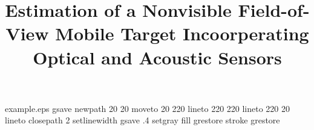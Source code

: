 %
%
%
%
%
\begin{filecontents*}{example.eps}
gsave
newpath
  20 20 moveto
  20 220 lineto
  220 220 lineto
  220 20 lineto
closepath
2 setlinewidth
gsave
  .4 setgray fill
grestore
stroke
grestore
\end{filecontents*}
%
\RequirePackage{fix-cm}
%
\documentclass[twocolumn]{svjour3}          %
%
\smartqed  %
%
\usepackage{graphicx}
\usepackage{amssymb,amsmath}
\usepackage{verbatim,subfigure}
\usepackage{epsfig}
\usepackage{rotating}
\usepackage{picins}
\usepackage{flushend}
\usepackage[usenames,dvipsnames,svgnames,table]{xcolor}
\usepackage[pagebackref=true,breaklinks=true,colorlinks,linkcolor=black,bookmarks=false,citecolor=black]{hyperref}


%
%
%


\title{\LARGE \bf Estimation of a Nonvisible Field-of-View Mobile Target Incoorperating Optical and Acoustic Sensors%
}

